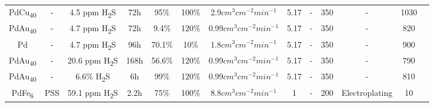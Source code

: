 \begin{longtable}{@{\extracolsep{\fill}}ccccccccccccc@{}}
    PdCu\textsubscript{40}                            & -               & 4.5 ppm H\textsubscript{2}S & 72h          & 95\%               & 100\%  & 2.9$cm^3 cm^{-2} min^{-1}$       & 5.17                             & -           & 350                                    & -                   & 1030                                                                                & \cite{DavidL.McKinley1964}                  \\

    PdAu\textsubscript{40}                            & -               & 4.7 ppm H\textsubscript{2}S & 72h          & 9.4\%               & 120\%  & 0.99$cm^3 cm^{-2} min^{-1}$       & 5.17                             & -           & 350                                    & -                   & 820                                                                                & \cite{DavidL.McKinley1964}                  \\

    Pd                            & -               & 4.7 ppm H\textsubscript{2}S & 96h          & 70.1\%               & 10\%  & 1.8$cm^3 cm^{-2} min^{-1}$       & 5.17                             & -           & 350                                    & -                   & 900                                                                                & \cite{DavidL.McKinley1964}                  \\

    PdAu\textsubscript{40}                            & -               & 20.6 ppm H\textsubscript{2}S & 168h          & 56.6\%               & 120\%  & 0.99$cm^3 cm^{-2} min^{-1}$       & 5.17                             & -           & 350                                    & -                   & 790                                                                                & \cite{DavidL.McKinley1964}                  \\

    PdAu\textsubscript{40}                            & -               & 6.6\% H\textsubscript{2}S & 6h          & 99\%               & 120\%  & 0.99$cm^3 cm^{-2} min^{-1}$       & 5.17                             & -           & 350                                    & -                   & 810                                                                                & \cite{DavidL.McKinley1964}                  \\

    PdFe\textsubscript{6}                            & PSS               & 59.1 ppm H\textsubscript{2}S & 2.2h          & 75\%               & 100\%  & 8.8$cm^3 cm^{-2} min^{-1}$       & 1                             & -           & 200                                    & Electroplating                   & 10                                                                                & \cite{Bryden2002}                  \\


\end{longtable}
